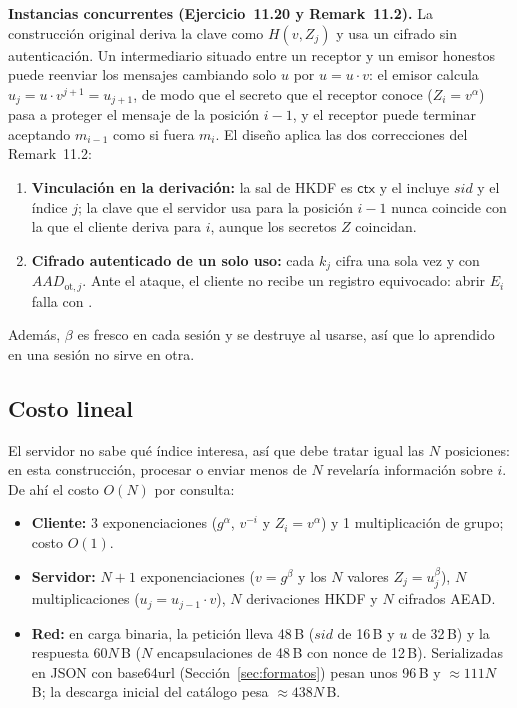 \textbf{Instancias concurrentes (Ejercicio~11.20 y Remark~11.2).}
La construcci\'on original deriva la clave como $H(v, Z_j)$ y usa un cifrado
sin autenticaci\'on. Un intermediario situado entre un receptor y un emisor
honestos puede reenviar los mensajes cambiando solo $u$ por
$\hat{u} = u \cdot v$: el emisor calcula
$\hat{u}_j = u\cdot v^{j+1} = u_{j+1}$, de modo que el secreto que el
receptor conoce ($Z_i = v^\alpha$) pasa a proteger el mensaje de la
posici\'on $i-1$, y el receptor puede terminar aceptando $m_{i-1}$ como si
fuera $m_i$. El dise\~no aplica las dos correcciones del Remark~11.2:
\begin{enumerate}
\item \textbf{Vinculaci\'on en la derivaci\'on:} la sal de HKDF es
$\mathsf{ctx}$ y el  incluye $sid$ y el \'indice $j$; la clave que
el servidor usa para la posici\'on $i-1$ nunca coincide con la que el cliente
deriva para $i$, aunque los secretos $Z$ coincidan.
\item \textbf{Cifrado autenticado de un solo uso:} cada $k_j$ cifra una sola
vez y con $AAD_{\mathrm{ot}, j}$. Ante el ataque, el cliente no recibe un
registro equivocado: abrir $E_i$ falla con .
\end{enumerate}
Adem\'as, $\beta$ es fresco en cada sesi\'on y se destruye al usarse, as\'i
que lo aprendido en una sesi\'on no sirve en otra.

\subsection{Costo lineal}
El servidor no sabe qu\'e \'indice interesa, as\'i que debe tratar igual las
$N$ posiciones: en esta construcci\'on, procesar o enviar menos de $N$
revelar\'ia informaci\'on sobre $i$. De ah\'i el costo $O(N)$ por consulta:
\begin{itemize}
\item \textbf{Cliente:} 3 exponenciaciones ($g^\alpha$, $v^{-i}$ y
$Z_i = v^\alpha$) y 1 multiplicaci\'on de grupo; costo $O(1)$.
\item \textbf{Servidor:} $N+1$ exponenciaciones ($v = g^\beta$ y los $N$
valores $Z_j = u_j^\beta$), $N$ multiplicaciones ($u_j = u_{j-1}\cdot v$),
$N$ derivaciones HKDF y $N$ cifrados AEAD.
\item \textbf{Red:} en carga binaria, la petici\'on lleva 48\,B ($sid$ de
16\,B y $u$ de 32\,B) y la respuesta $60N$\,B ($N$ encapsulaciones de 48\,B
con nonce de 12\,B). Serializadas en JSON con base64url
(Secci\'on~\ref{sec:formatos}) pesan unos 96\,B y $\approx 111N$\,B; la
descarga inicial del cat\'alogo pesa $\approx 438N$\,B.
\end{itemize}
